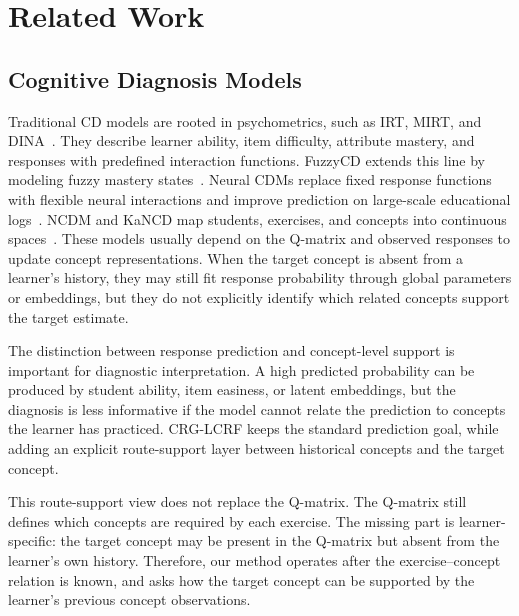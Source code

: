 \documentclass[conference]{IEEEtran}
\begin{document}
\section{Related Work}
\subsection{Cognitive Diagnosis Models}
Traditional CD models are rooted in psychometrics, such as IRT, MIRT, and DINA~\cite{lord1980irt,reckase2009mirt,delatorre2009dina,templin2006cdm}. They describe learner ability, item difficulty, attribute mastery, and responses with predefined interaction functions. FuzzyCD extends this line by modeling fuzzy mastery states~\cite{liu2018fuzzycd}. Neural CDMs replace fixed response functions with flexible neural interactions and improve prediction on large-scale educational logs~\cite{wang2020ncdm}. NCDM and KaNCD map students, exercises, and concepts into continuous spaces~\cite{wang2020ncdm,wang2022kscd}. These models usually depend on the Q-matrix and observed responses to update concept representations. When the target concept is absent from a learner's history, they may still fit response probability through global parameters or embeddings, but they do not explicitly identify which related concepts support the target estimate.

The distinction between response prediction and concept-level support is important for diagnostic interpretation. A high predicted probability can be produced by student ability, item easiness, or latent embeddings, but the diagnosis is less informative if the model cannot relate the prediction to concepts the learner has practiced. CRG-LCRF keeps the standard prediction goal, while adding an explicit route-support layer between historical concepts and the target concept.

This route-support view does not replace the Q-matrix. The Q-matrix still defines which concepts are required by each exercise. The missing part is learner-specific: the target concept may be present in the Q-matrix but absent from the learner's own history. Therefore, our method operates after the exercise--concept relation is known, and asks how the target concept can be supported by the learner's previous concept observations.
\end{document}
